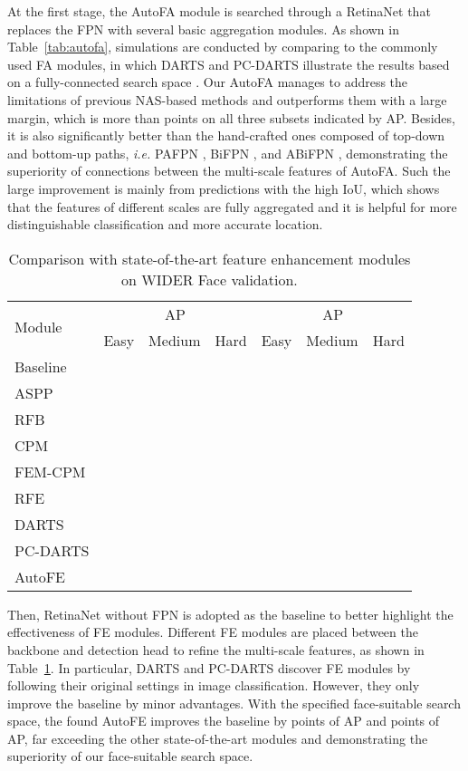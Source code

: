 \documentclass[sigconf]{acmart}
\begin{document}
At the first stage, the AutoFA module is searched through a RetinaNet that replaces the FPN with several basic aggregation modules. 
As shown in Table~\ref{tab:autofa}, simulations are conducted by comparing to the commonly used FA modules, in which DARTS \cite{liu2018darts} and PC-DARTS \cite{xu2019pcdarts} illustrate the results based on a fully-connected search space \cite{wang2019nasfcos}. Our AutoFA manages to address the limitations of previous NAS-based methods and outperforms them with a large margin, which is more than  points on all three subsets indicated by AP. 
Besides, it is also significantly better than the hand-crafted ones composed of top-down and bottom-up paths, \textit{i.e.} PAFPN \cite{liu2018pafpn}, BiFPN \cite{tan2020efficientdet}, and ABiFPN \cite{zhang2020acfd}, demonstrating the superiority of connections between the multi-scale features of AutoFA.
Such the large improvement is mainly from predictions with the high IoU, which shows that the features of different scales are fully aggregated and it is helpful for more distinguishable classification and more accurate location.

\begin{table}[!t]
    \centering
    \begin{tabular}{l|ccc|ccc}
        \toprule[1pt]
        \multirow{2}{*}{Module} & \multicolumn{3}{c|}{AP} & \multicolumn{3}{c}{AP} \\
        \cline{2-7}
        & Easy & Medium & Hard & Easy & Medium & Hard \\
        \midrule[0.5pt]
        Baseline &  &  &  &  &  &  \\
        ASPP &  &  &  &  &  &  \\
        RFB &  &  &  &  &  &  \\
        CPM &  &  &  &  &  &  \\
        FEM-CPM &  &  &  &  &  &  \\
        RFE &  &  &  &  &  &  \\
        DARTS &  &  &  &  &  &  \\
        PC-DARTS &  &  &  &  &  &  \\
        \bottomrule[0.5pt]
        AutoFE &  &  &  &  &  &  \\
        \bottomrule[1pt]
    \end{tabular}
    \caption{Comparison with state-of-the-art feature enhancement modules on WIDER Face validation.}
    \label{tab:autofe}
\end{table}

Then, RetinaNet without FPN is adopted as the baseline to better highlight the effectiveness of FE modules. 
Different FE modules are placed between the backbone and detection head to refine the multi-scale features, as shown in Table~\ref{tab:autofe}. In particular, DARTS and PC-DARTS discover FE modules by following their original settings in image classification. However, they only improve the baseline by minor advantages.
With the specified face-suitable search space, the found AutoFE improves the baseline by  points of AP and  points of AP, far exceeding the other state-of-the-art modules and demonstrating the superiority of our face-suitable search space.
\end{document}
